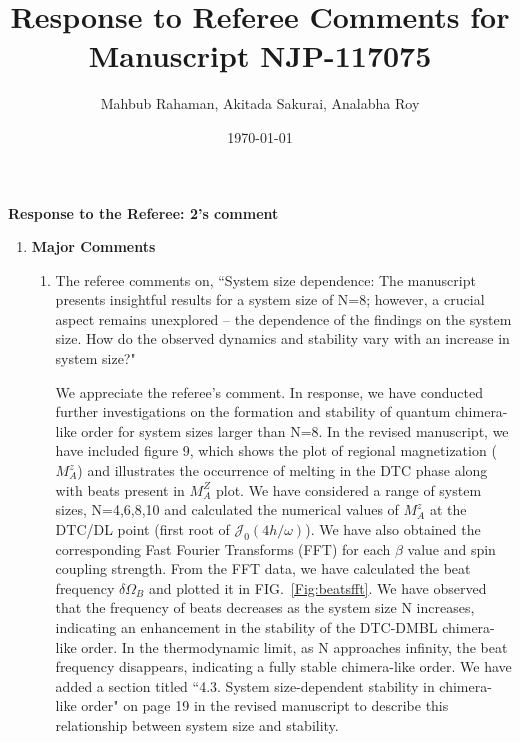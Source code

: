 \documentclass[aps,prb,reprint,showpacs,floatfix,superscriptaddress, onecolumn, nofootinbib, 10pt]{revtex4-2}
\newcommand{\response}[1]{{\color{black}#1}} %
\newcommand{\comment}[1]{{\color{blue}#1}} %
\newcommand{\red}[1]{{\color{red}#1}} %
\newcommand{\figref}[1]{FIG.~\ref{#1}}
\begin{document}

\title{Response to Referee Comments for Manuscript NJP-117075}
\author{Mahbub Rahaman, Akitada Sakurai, Analabha Roy}
\date{\today}

\maketitle

\vspace{1em}

\noindent \textbf{Response to the Referee: 2's comment}
\begin{enumerate}
	\item {\bf Major Comments}
	\begin{enumerate}
		\item The referee comments on, \comment{``System size dependence: The manuscript presents insightful results for a system size
				of N=8; however, a crucial aspect remains unexplored – the dependence of the
				findings on the system size. How do the observed dynamics and stability vary with an
				increase in system size?"}\\
		
		\response{
			We appreciate the referee's comment. In response, we have conducted further investigations on the formation and stability of quantum chimera-like order for system sizes larger than N=8. In the revised manuscript, we have included figure 9, which shows the plot of regional magnetization ($M^z_A$) and illustrates the occurrence of melting in the DTC phase \red{along with beats present in $M^Z_A$ plot}. We have considered a range of system sizes, N=4,6,8,10 and calculated the numerical values of $M^z_A$ at the DTC/DL point \red{(first root of $\mathcal{J}_0(4h/\omega)$)}. We have also obtained the corresponding Fast Fourier Transforms (FFT) for each $\beta$ value and spin coupling strength. From the FFT data, we have calculated the beat frequency $\delta \Omega_B$ \cite{Liu2023,CHANDRA2024129552}  and plotted it in \figref{Fig:beatsfft}. We have observed that the frequency of beats decreases as the system size N increases, indicating an enhancement in the stability of the DTC-DMBL chimera-like order. In the thermodynamic limit, as N approaches infinity, the beat frequency disappears, indicating a fully stable chimera-like order. We have added a section titled ``4.3. System size-dependent stability in chimera-like order" on page 19 in the revised manuscript to describe this relationship between system size and stability.


}
\end{enumerate}
\end{enumerate}
\end{document}
